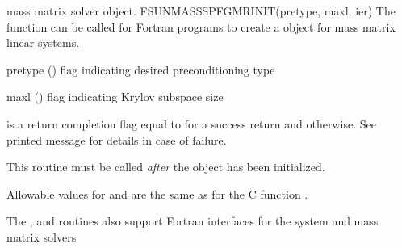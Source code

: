  mass matrix solver object.
{
  FSUNMASSSPFGMRINIT(pretype, maxl, ier)
}
{
  The function  can be called for Fortran programs
  to create a {\sunlinsolspfgmr} object for mass matrix linear systems.
}
{
  \begin{args}[pretype]
  \item[pretype] ()
    flag indicating desired preconditioning type
  \item[maxl] ()
    flag indicating Krylov subspace size
  \end{args}
}
{
   is a  return completion flag equal to  for a success
  return and  otherwise. See printed message for details in case
  of failure.
}
{
  This routine must be called \emph{after} the {\nvector} object has
  been initialized.

  Allowable values for  and  are the same as for
  the C function .
}
The , 
and  routines also support Fortran
interfaces for the system and mass matrix solvers

